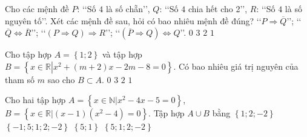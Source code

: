 \begin{ex}
	Cho các mệnh đề $P$: \lq\lq Số $4$ là số chẵn\rq\rq, $Q$: \lq\lq Số $4$ chia hết cho 2\rq\rq, $R$: \lq\lq Số $4$ là số nguyên tố\rq\rq. Xét các mệnh đề sau, hỏi có bao nhiêu mệnh đề đúng?
	\lq\lq $P\Rightarrow \overline{Q}$\rq\rq; \lq\lq $\overline{Q}\Leftrightarrow \overline{R}$\rq\rq; \lq\lq $\left(P\Rightarrow Q\right)\Rightarrow R$\rq\rq; \lq\lq $\left(\overline{P}\Rightarrow Q\right)\Leftrightarrow Q$\rq\rq.
	\choice
	{$0$}
	{$3$}
	{$2$}
	{\True $1$}
\end{ex}
\begin{ex}
	Cho tập hợp $A=\left\{ 1;2 \right\}$ và tập hợp $B=\left\{ x\in \mathbb{R}\left| x^2+(m+2)x-2m-8=0 \right. \right\}$. Có bao nhiêu giá trị nguyên của tham số $m$ sao cho $B\subset A$.
	\choice
	{$0$}
	{$3$}
	{\True $2$}
	{$1$}
\end{ex}
\begin{ex}
	Cho hai tập hợp $A=\left\{ x\in \mathbb{N}|x^2-4x-5=0 \right\}$, $B=\left\{ x\in \mathbb{R}|(x-1)\left(x^2-4\right)=0 \right\}$. Tập hợp $A\cup B$ bằng
	\choice
	{$\left\{ 1;2;-2 \right\}$}
	{$\left\{ -1;5;1;2;-2 \right\}$}
	{$\left\{ 5;1 \right\}$}
	{\True $\left\{ 5;1;2;-2 \right\}$}
\end{ex}
